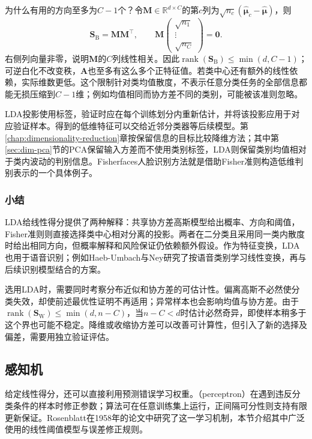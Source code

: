为什么有用的方向至多为$C-1$个？令$\bm{M}\in\mathbb{R}^{d\times C}$的第$c$列为$\sqrt{n_c}(\hat{\bm{\mu}}_c-\hat{\bm{\mu}})$，则
\[
  \bm{S}_{\mathrm{B}}=\bm{M}\bm{M}^{\top},\qquad
  \bm{M}
  \begin{pmatrix}\sqrt{n_1}\\ \vdots\\ \sqrt{n_C}\end{pmatrix}
  =\bm{0}.
\]
右侧列向量非零，说明$\bm{M}$的$C$列线性相关。因此$\operatorname{rank}(\bm{S}_{\mathrm{B}})\leq\min(d,C-1)$；可逆白化不改变秩，$\bm{A}$也至多有这么多个正特征值。若类中心还有额外的线性依赖，实际维数更低。这个限制针对类均值散度，不表示任意分类任务的全部信息都能无损压缩到$C-1$维；例如均值相同而协方差不同的类别，可能被该准则忽略。

LDA投影使用标签，验证时应在每个训练划分内重新估计，并将该投影应用于对应验证样本。得到的低维特征可以交给近邻分类器等后续模型。第\ref{chap:dimensionality-reduction}章按保留信息的目标比较降维方法；其中第\ref{sec:dim-pca}节的PCA保留输入方差而不使用类别标签，LDA则保留类别均值相对于类内波动的判别信息。Fisherfaces人脸识别方法就是借助Fisher准则构造低维判别表示的一个具体例子。

\subsubsection{小结}
\label{sec:classification-lda-summary}

LDA给线性得分提供了两种解释：共享协方差高斯模型给出概率、方向和阈值，Fisher准则则直接选择类中心相对分离的投影。两者在二分类且采用同一类内散度时给出相同方向，但概率解释和风险保证仍依赖额外假设。作为特征变换，LDA也用于语音识别；例如Haeb-Umbach与Ney研究了按语音类别学习线性变换，再与后续识别模型结合的方案。

选用LDA时，需要同时考察分布近似和协方差的可估计性。偏离高斯不必然使分类失效，却使前述最优性证明不再适用；异常样本也会影响均值与协方差。由于$\operatorname{rank}(\bm{S}_{\mathrm{W}})\leq\min(d,n-C)$，当$n-C<d$时估计必然奇异，即使样本稍多于这个界也可能不稳定。降维或收缩协方差可以改善可计算性，但引入了新的选择及偏差，需要用独立验证评估。

\subsection{感知机}
\label{sec:classification-perceptron}

给定线性得分，还可以直接利用预测错误学习权重。（perceptron）在遇到违反分类条件的样本时修正参数；算法可在任意训练集上运行，正间隔可分性则支持有限更新保证。Rosenblatt在1958年的论文中研究了这一学习机制，本节介绍其中广泛使用的线性阈值模型与误差修正规则。

